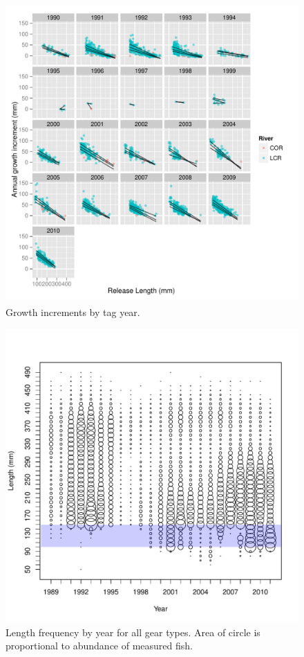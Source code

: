 
\begin{figure}[htbp]
	\centering
		\includegraphics[height=4.5in]{../FIGS/LSMR/fig:GrowthIncrements.pdf}
	\caption{Growth increments by tag year.}
	\label{fig:FIGS_LSMR_fig:GrowthIncrements}
\end{figure}

\begin{figure}[htbp]
	\centering
		\includegraphics[width=6.5in]{../FIGS/LSMR/fig:CaptureLFbubbles.pdf}
	\caption{Length frequency by year for all gear types. Area of circle is proportional to abundance of measured fish.}
	\label{fig:FIGS_LSMR_fig:CaptureLFbubbles}
\end{figure}

